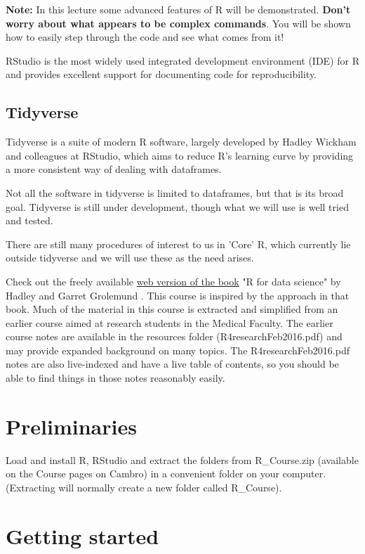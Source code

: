 \documentclass[titlepage]{book}
\begin{document}
\textbf{Note:} In this lecture some advanced features of R will be demonstrated. \textbf{Don't worry about what appears to be complex commands}. You will be shown how to easily step through the code and see what comes from it! 

RStudio is the most widely used integrated development environment (IDE) for R and provides excellent support for documenting code for reproducibility.

\subsection{Tidyverse}
Tidyverse is a suite of modern R software, largely developed by Hadley Wickham and colleagues at RStudio, which aims to reduce R's learning curve by providing a more consistent way of dealing with dataframes. 

Not all the software in tidyverse is limited to dataframes, but that is its broad goal.   Tidyverse is still under development, though what we will use is well tried and tested. 

There are still many procedures of interest to us in 'Core' R, which currently lie outside tidyverse and we will use these as the need arises. 

Check out the freely available \href{https://r4ds.had.co.nz/index.html}{web version of the book} "R for data science" by Hadley and Garret Grolemund \cite{Wickham2016}. This course is inspired by the approach in that book.  Much of the material in this course is extracted and simplified from an earlier course aimed at research students in the Medical Faculty. The earlier course notes are available in the resources folder (R4researchFeb2016.pdf) and may provide expanded background on many topics. The R4researchFeb2016.pdf notes are also live-indexed and have a live table of contents, so you should be able to find things in those notes reasonably easily.

\section{Preliminaries}

Load and install R, RStudio and extract the folders from R\_Course.zip (available on the Course pages on Cambro) in a convenient folder on your computer. (Extracting will normally create a new folder called R\_Course).

\section{Getting started}
\end{document}
